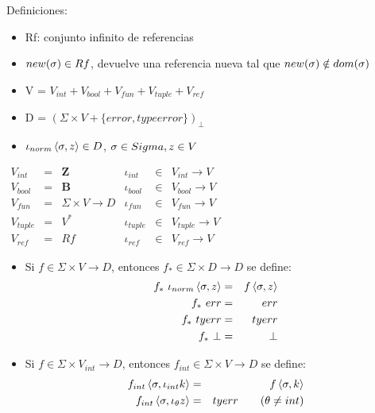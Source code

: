     \PN Definiciones:
    \begin{itemize}
      \item Rf: conjunto infinito de referencias
      \item $new(\sigma) \in Rf$, devuelve una referencia nueva tal que $new(\sigma) \notin dom(\sigma)$
      \item V = $V_{int} + V_{bool} + V_{fun} + V_{tuple} + V_{ref}$
      \item D = $(\Sigma \times V + \{error, typeerror\})_{\bot}$
      \item $\iota_{norm} \left\langle \sigma, z \right\rangle \in D$, $\sigma \in Sigma, z \in V$
    \end{itemize}
  
    \vspace{3mm}
    $\begin{array}{lllllll}
      V_{int} &=& \mathbf{Z} & \iota_{int} &\in& V_{int} \rightarrow V \\
      V_{bool} &=& \mathbf{B} & \iota_{bool} &\in& V_{bool} \rightarrow V \\
      V_{fun} &=& \Sigma \times V \rightarrow D & \iota_{fun} &\in& V_{fun} \rightarrow V \\
      V_{tuple} &=& V^{\ast} & \iota_{tuple} &\in& V_{tuple} \rightarrow V \\
      V_{ref} &=& Rf & \iota_{ref} &\in& V_{ref} \rightarrow V
    \end{array}$

    \vspace{3mm}
    \begin{itemize}
      \item Si $f \in \Sigma\times V\rightarrow D$, entonces $f_* \in \Sigma\times D \rightarrow D$ se define:
        \begin{eqnarray*}
          f_* \ \iota_{norm}\left\langle \sigma,z\right\rangle &=& f \left\langle\sigma,z\right\rangle \\
          f_* \ err &=& err \\
          f_* \ tyerr &=& tyerr \\
          f_* \ \bot &=& \bot
        \end{eqnarray*}
      \item Si $f \in \Sigma\times V_{int}\rightarrow D$, entonces $f_{int} \in \Sigma\times V \rightarrow D$ se define:
        \begin{eqnarray*}
          f_{int} \left\langle \sigma,\iota_{int} k\right\rangle &=& f \left\langle\sigma,k\right\rangle \\
          f_{int} \left\langle \sigma,\iota_{\theta} z\right\rangle &=& tyerr \qquad(\theta\neq int)
        \end{eqnarray*}
    \end{itemize}

